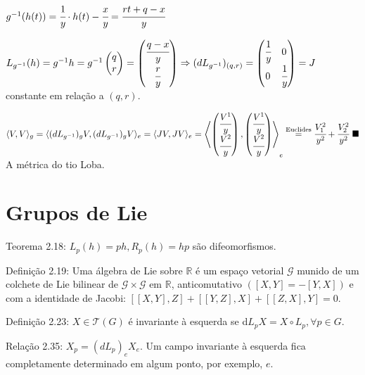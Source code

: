 \documentclass[12pt]{article}
\begin{document}
		$g^{-1}(h(t)) = \cfrac{1}{y} \cdot h(t) - \cfrac{x}{y} = \cfrac{rt + q - x}{y}$

		$L_{g^{-1}}(h) = g^{-1} h = g^{-1}\left(\begin{matrix} q \\ r \end{matrix} \right) = \left(\begin{matrix} \cfrac{q-x}{y} \\ \cfrac{r}{y} \end{matrix} \right) \Rightarrow (dL_{g^{-1}})_{(q,r)} = \left( \begin{matrix} \cfrac{1}{y} & 0 \\ 0 & \cfrac{1}{y} \end{matrix} \right) = J$ constante em rela\c{c}\~ao a $(q,r)$.

		$\langle V, V \rangle_g = \langle (dL_{g^{-1}})_g V, (dL_{g^{-1}})_g V \rangle_e = \langle J V, J V \rangle_e = \left\langle \left(\begin{matrix} \cfrac{V^1}{y} \\ \cfrac{V^2}{y} \end{matrix} \right), \left(\begin{matrix} \cfrac{V^1}{y} \\ \cfrac{V^2}{y} \end{matrix} \right) \right\rangle_e \stackrel{\text{Euclides}}{=} \cfrac{V_1^2}{y^2} + \cfrac{V_2^2}{y^2} \,\,\blacksquare$ A m\'etrica do tio Loba.

		\section{Grupos de Lie}
		\begin{flushright}
		\end{flushright}

		Teorema 2.18: $L_p(h) = ph, R_p(h) = hp$ s\~ao difeomorfismos.

		Defini\c{c}\~ao 2.19: Uma \'algebra de Lie sobre $\mathbb{R}$ \'e um espa\c{c}o vetorial $\mathcal{G}$ munido de um colchete de Lie bilinear de $\mathcal{G} \times \mathcal{G}$ em $\mathbb{R}$, anticomutativo $([X,Y] = -[Y,X])$ e com a identidade de Jacobi: $[[X,Y], Z] + [[Y,Z],X] + [[Z,X],Y] = 0$.

		Defini\c{c}\~ao 2.23: $X \in \mathcal{T}(G)$ \'e invariante \`a esquerda se d$L_p X = X \circ L_p, \forall p \in G$.

		Rela\c{c}\~ao 2.35: $X_p = (dL_p)_e X_e$. Um campo invariante \`a esquerda fica completamente determinado em algum ponto, por exemplo, $e$.
\end{document}
